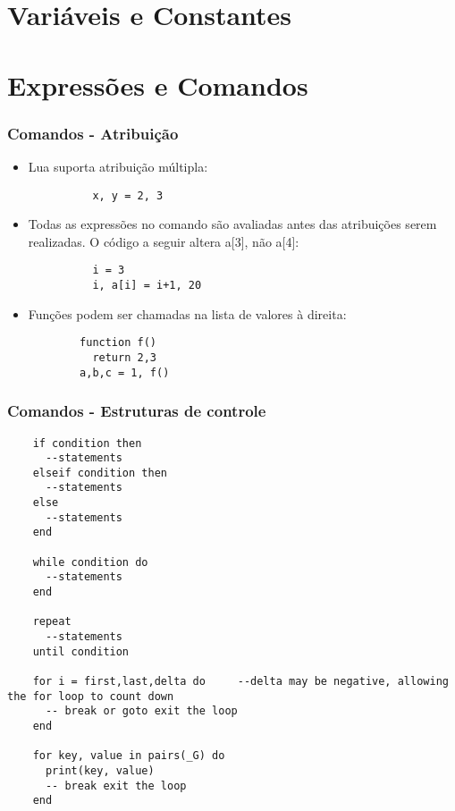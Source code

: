 \documentclass{ime-beamer}
\begin{document}
\section{Variáveis e Constantes}

\section{Expressões e Comandos}
\begin{frame}[fragile]
  \frametitle{Comandos - Atribuição}
  \begin{block}{}
    \begin{itemize}
      \item Lua suporta atribuição múltipla:
        \begin{lstlisting}
          x, y = 2, 3
        \end{lstlisting}
      \item Todas as expressões no comando são avaliadas antes das atribuições serem
        realizadas. O código a seguir altera a[3], não a[4]:
        \begin{lstlisting}
          i = 3
          i, a[i] = i+1, 20
        \end{lstlisting}
      \item Funções podem ser chamadas na lista de valores à direita:
        \begin{lstlisting}
        function f()
          return 2,3
        a,b,c = 1, f()
        \end{lstlisting}
    \end{itemize}
  \end{block}{}
\end{frame}

\begin{frame}[fragile]
  \frametitle{Comandos - Estruturas de controle}
  \begin{block}{}
    \begin{lstlisting}
    if condition then
      --statements
    elseif condition then
      --statements
    else
      --statements
    end

    while condition do
      --statements
    end
     
    repeat
      --statements
    until condition
       
    for i = first,last,delta do     --delta may be negative, allowing the for loop to count down
      -- break or goto exit the loop
    end

    for key, value in pairs(_G) do
      print(key, value)
      -- break exit the loop
    end
    \end{lstlisting}
  \end{block}
\end{frame}
\end{document}
